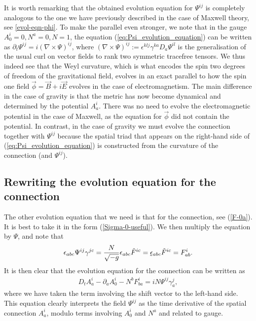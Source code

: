 \documentclass[10pt]{report}
\newcommand{\utilde}[1]{\underaccent{\tilde}{#1}}
\theoremstyle{definition}
\newcommand{\im}{i}
\begin{document}
It is worth remarking that the obtained evolution equation for $\Psi^{ij}$ is completely analogous to the one we have previously described in the case of Maxwell theory, see \cref{evol-eqn-phi}. To make the parallel even stronger, we note that in the gauge $A_0^i=0, N^a=0, N=1$, the equation (\ref{eq:Psi_evolution_equation}) can be written as $\partial_t \Psi^{ij} = \im (\nabla \times \Psi)^{ij}$, where $(\nabla \times \Psi)^{ij}:= \epsilon^{klj} \gamma^{ka} D_a \Psi^{il}$ is the generalisation of the usual curl on vector fields to rank two symmetric tracefree tensors. We thus indeed see that the Weyl curvature, which is what encodes the spin two degrees of freedom of the gravitational field, evolves in an exact parallel to how the spin one field $\vec{\phi}=\vec{B} +\im \vec{E}$ evolves in the case of electromagnetism. The main difference in the case of gravity is that the metric has now become dynamical and determined by the potential $A_a^i$. There was no need to evolve the electromagnetic potential in the case of Maxwell, as the equation for $\vec{\phi}$ did not contain the potential. In contrast, in the case of gravity we must evolve the connection together with $\Psi^{ij}$ because the spatial triad that appears on the right-hand side of (\ref{eq:Psi_evolution_equation}) is constructed from the curvature of the connection (and $\Psi^{ij}$). 

\subsection{Rewriting the evolution equation for the connection}


The other evolution equation that we need is that for the connection, see (\ref{F-0a}). It is best to take it in the form (\ref{Sigma-0-useful}). We then multiply the equation by $\Psi$, and note that 
\begin{align}
\epsilon_{abc} \Psi^{ij} \gamma^{jc} = \frac{N}{\sqrt{-g}} \epsilon_{abc} \tilde{F}^{ic} = \utilde{\epsilon}_{abc} \tilde{F}^{ic} = F^i_{ab}.
\end{align}
It is then clear that the evolution equation for the connection can be written as
\begin{align}\label{evolution-connection}
D_t A^i_a - \partial_a A^i_0 - N^b F^i_{ba} = \im N \Psi^{ij} \gamma^j_a,
\end{align}
where we have taken the term involving the shift vector to the left-hand side. This equation clearly interprets the field $\Psi^{ij}$ as the time derivative of the spatial connection $A^i_a$, modulo terms involving $A_0^i$ and $N^a$ and related to gauge. 
\end{document}
